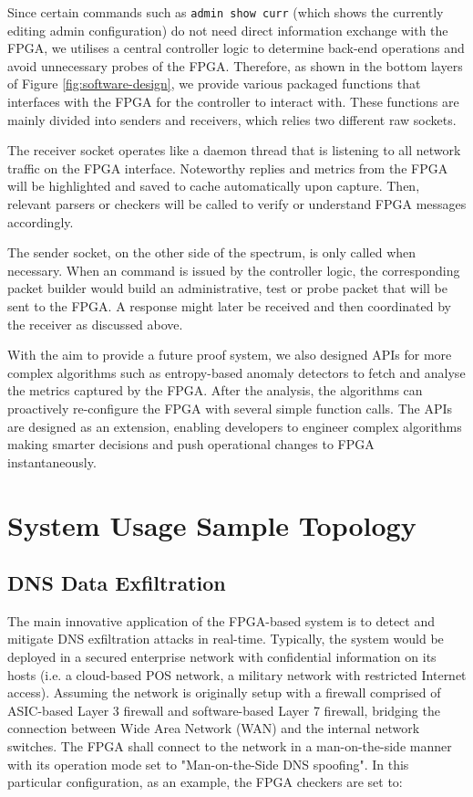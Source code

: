 \documentclass[a4paper]{report}
\newcommand{\code}{\texttt}
\begin{document}
Since certain commands such as \code{admin show curr} (which shows the currently editing admin configuration) do not need direct information exchange with the FPGA, we utilises a central controller logic to determine back-end operations and avoid unnecessary probes of the FPGA. Therefore, as shown in the bottom layers of Figure \ref{fig:software-design}, we provide various packaged functions that interfaces with the FPGA for the controller to interact with. These functions are mainly divided into senders and receivers, which relies two different raw sockets.

The receiver socket operates like a daemon thread that is listening to all network traffic on the FPGA interface. Noteworthy replies and metrics from the FPGA will be highlighted and saved to cache automatically upon capture. Then, relevant parsers or checkers will be called to verify or understand FPGA messages accordingly. 

The sender socket, on the other side of the spectrum, is only called when necessary. When an command is issued by the controller logic, the corresponding packet builder would build an administrative, test or probe packet that will be sent to the FPGA. A response might later be received and then coordinated by the receiver as discussed above.

With the aim to provide a future proof system, we also designed APIs for more complex algorithms such as entropy-based anomaly detectors to fetch and analyse the metrics captured by the FPGA. After the analysis, the algorithms can proactively re-configure the FPGA with several simple function calls. The APIs are designed as an extension, enabling developers to engineer complex algorithms making smarter decisions and push operational changes to FPGA instantaneously.

\section{System Usage Sample Topology}
\label{section:design-system-usage-sample}

\subsection{DNS Data Exfiltration}

The main innovative application of the FPGA-based system is to detect and mitigate DNS exfiltration attacks in real-time. Typically, the system would be deployed in a secured enterprise network with confidential information on its hosts (i.e. a cloud-based POS network, a military network with restricted Internet access). Assuming the network is originally setup with a firewall comprised of ASIC-based Layer 3 firewall and software-based Layer 7 firewall, bridging the connection between Wide Area Network (WAN) and the internal network switches. The FPGA shall connect to the network in a man-on-the-side manner with its operation mode set to "Man-on-the-Side DNS spoofing".  In this particular configuration, as an example, the FPGA checkers are set to:
\end{document}
